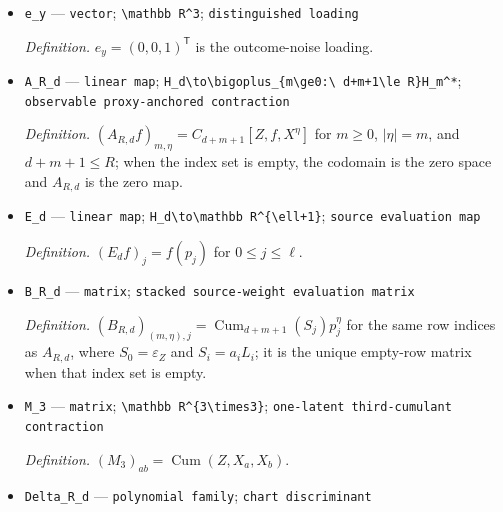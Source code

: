 \documentclass{article}
\begin{document}
\begin{itemize}
  \par\smallskip\noindent\emph{Definition.} \(q_{\beta}=(0,1,\beta)^{\mathsf T}\) is the treatment-noise loading.
  \item \texttt{e\_\allowbreak{}y} --- \texttt{vector}; \texttt{\textbackslash{}\allowbreak{}mathbb R\textasciicircum{}3}; \texttt{distinguished loading}
  \par\smallskip\noindent\emph{Definition.} \(e_y=(0,0,1)^{\mathsf T}\) is the outcome-noise loading.
  \item \texttt{A\_\allowbreak{}R\_\allowbreak{}d} --- \texttt{linear map}; \texttt{H\_\allowbreak{}d\textbackslash{}\allowbreak{}to\textbackslash{}\allowbreak{}bigoplus\_\allowbreak{}\{m\textbackslash{}\allowbreak{}ge0:\allowbreak{}\textbackslash{}\allowbreak{} d+\allowbreak{}m+\allowbreak{}1\textbackslash{}\allowbreak{}le R\}\allowbreak{}H\_\allowbreak{}m\textasciicircum{}*}; \texttt{observable proxy-\allowbreak{}anchored contraction}
  \par\smallskip\noindent\emph{Definition.} \((A_{R,d}f)_{m,\eta}=C_{d+m+1}[Z,f,X^{\eta}]\) for \(m\ge0\), \(|\eta|=m\), and \(d+m+1\le R\); when the index set is empty, the codomain is the zero space and \(A_{R,d}\) is the zero map.
  \item \texttt{E\_\allowbreak{}d} --- \texttt{linear map}; \texttt{H\_\allowbreak{}d\textbackslash{}\allowbreak{}to\textbackslash{}\allowbreak{}mathbb R\textasciicircum{}\{\textbackslash{}\allowbreak{}ell+\allowbreak{}1\}\allowbreak{}}; \texttt{source evaluation map}
  \par\smallskip\noindent\emph{Definition.} \((E_df)_j=f(p_j)\) for \(0\le j\le\ell\).
  \item \texttt{B\_\allowbreak{}R\_\allowbreak{}d} --- \texttt{matrix}; \texttt{stacked source-\allowbreak{}weight evaluation matrix}
  \par\smallskip\noindent\emph{Definition.} \((B_{R,d})_{(m,\eta),j}=\operatorname{Cum}_{d+m+1}(S_j)p_j^{\eta}\) for the same row indices as \(A_{R,d}\), where \(S_0=\varepsilon_Z\) and \(S_i=a_iL_i\); it is the unique empty-row matrix when that index set is empty.
  \item \texttt{M\_\allowbreak{}3} --- \texttt{matrix}; \texttt{\textbackslash{}\allowbreak{}mathbb R\textasciicircum{}\{3\textbackslash{}\allowbreak{}times3\}\allowbreak{}}; \texttt{one-\allowbreak{}latent third-\allowbreak{}cumulant contraction}
  \par\smallskip\noindent\emph{Definition.} \((M_3)_{ab}=\operatorname{Cum}(Z,X_a,X_b)\).
  \item \texttt{Delta\_\allowbreak{}R\_\allowbreak{}d} --- \texttt{polynomial family}; \texttt{chart discriminant}

\end{itemize}
\end{document}
